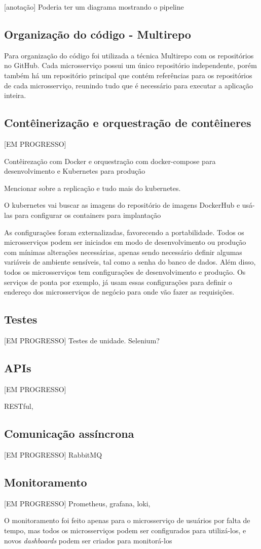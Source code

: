 [anotação] Poderia ter um diagrama mostrando o pipeline


\subsection*{Organização do código - Multirepo}
Para organização do código foi utilizada a técnica Multirepo com os repositórios no GitHub. Cada microsserviço possui um único repositório independente, porém também há um repositório principal que contém referências para os repositórios de cada microsserviço, reunindo tudo que é necessário para executar a aplicação inteira.

\subsection*{Contêinerização e orquestração de contêineres}
[EM PROGRESSO]

Contêirezação com Docker e orquestração com docker-compose para desenvolvimento e Kubernetes para produção

Mencionar sobre a replicação e tudo mais do kubernetes.

O kubernetes vai buscar as imagens do repositório de imagens DockerHub e usá-las para configurar os containers para implantação

As configurações foram externalizadas, favorecendo a portabilidade. Todos os microsserviços podem ser iniciados em modo de desenvolvimento ou produção com mínimas alterações necessárias, apenas sendo necessário definir algumas variáveis de ambiente sensíveis, tal como a senha do banco de dados. Além disso, todos os microsserviços tem configurações de desenvolvimento e produção. Os serviços de ponta por exemplo, já usam essas configurações para definir o endereço dos microsserviços de negócio para onde vão fazer as requisições.

\subsection*{Testes}
[EM PROGRESSO]
Testes de unidade. Selenium?

\subsection*{APIs}
[EM PROGRESSO]

RESTful, 

\subsection*{Comunicação assíncrona}
[EM PROGRESSO] RabbitMQ

\subsection*{Monitoramento}
[EM PROGRESSO] Prometheus, grafana, loki,

O monitoramento foi feito apenas para o microsserviço de usuários por falta de tempo, mas todos os microsserviços podem ser configurados para utilizá-los, e novos \emph{dashboards} podem ser criados para monitorá-los